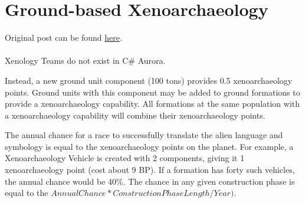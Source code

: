 \documentclass[../../Aurora C# unofficial manual.tex]{subfiles}
\begin{document}
	\section{Ground-based Xenoarchaeology}
	Original post can be found
	\href{http://aurora2.pentarch.org/index.php?topic=8495.msg111167#msg111167}{here}.
	\\\\
	
	Xenology Teams do not exist in C\# Aurora.
	
	Instead, a new ground unit component (100 tons) provides 0.5 xenoarchaeology points. Ground units with this component may be added to ground formations to provide a xenoarchaeology capability. All formations at the same population with a xenoarchaeology capability will combine their xenoarchaeology points.
	
	The annual chance for a race to successfully translate the alien language and symbology is equal to the xenoarchaeology points on the planet. For example, a Xenoarchaeology Vehicle is created with 2 components, giving it 1 xenoarchaeology point (cost about 9 BP). If a formation has forty such vehicles, the annual chance would be 40\%. The chance in any given construction phase is equal to the \( Annual Chance * Construction Phase Length / Year) \).
\end{document}
